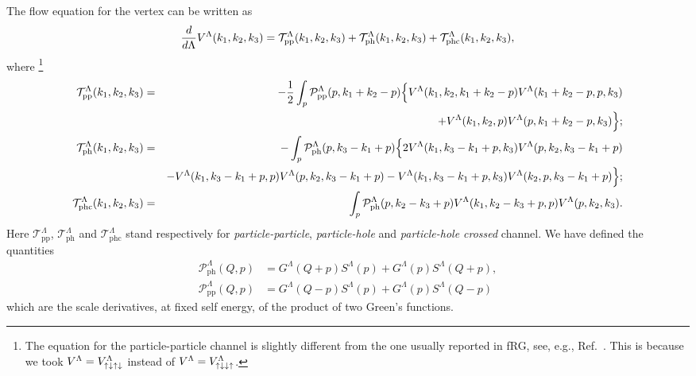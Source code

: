 \begin{widetext} 
The flow equation for the vertex can be written as \cite{Metzner2012, Husemann2009}
\begin{align}
\label{eq:vertflow}
 \frac{d}{d\Lambda}V^\Lambda(k_1,k_2,k_3) = \mathcal{T}^{\Lambda}_{\mathrm{pp} }(k_1,k_2,k_3) +  
  \mathcal{T}^{\Lambda}_{\mathrm{ph} }(k_1,k_2,k_3) + \mathcal{T}^{\Lambda}_{\mathrm{phc} }(k_1,k_2,k_3),
\end{align} 
where \footnote{The equation for the particle-particle channel is slightly different from the one usually reported in fRG, see, e.g., Ref.~. This is because we took $V^{\Lambda}_{\mathrm{} } = V^{\Lambda}_{\mathrm{\uparrow \downarrow \uparrow\downarrow} }$ instead of $V^{\Lambda}_{\mathrm{} } = V^{\Lambda}_{\mathrm{\uparrow\downarrow\downarrow\uparrow} }$.}
\begin{eqnarray}
\label{eq:ppT} 
\mathcal{T}^{\Lambda}_{\mathrm{pp} }(k_1,k_2,k_3) &=&-\frac{1}{2} \int_p \mathcal{P}^{\Lambda}_{\mathrm{\mathrm{pp}} }(p,k_1+k_2-p) \Big\{  V^{\Lambda}_{\mathrm{} }(k_1,k_2,k_1+k_2-p)V^{\Lambda}_{\mathrm{} }(k_1+k_2-p,p,k_3) 
\label{eq:tpp} 
   \\ 
\nonumber
&&+  V^{\Lambda}_{\mathrm{} }(k_1,k_2,p)V^{\Lambda}_{\mathrm{} }(p,k_1+k_2-p,k_3) \Big\} ; \\  
\label{eq:tph} 
\mathcal{T} ^{\Lambda}_{\mathrm{ph} }(k_1,k_2,k_3) & =& -\int_p \mathcal{P}^{\Lambda}_{\mathrm{\mathrm{ph}} }(p,k_3-k_1+p)
\Big\{ 2 V^{\Lambda}_{\mathrm{} }( k_1,k_3-k_1+p,k_3)  V^{\Lambda}_{\mathrm{} }(p,k_2,k_3-k_1+p) \\
\nonumber
&&- V^{\Lambda}_{\mathrm{} }( k_1,k_3-k_1+p,p)  V^{\Lambda}_{\mathrm{} }(p,k_2,k_3-k_1+p) - V^{\Lambda}_{\mathrm{} }( k_1,k_3-k_1+p,k_3)  V^{\Lambda}_{\mathrm{} }(k_2,p,k_3-k_1+p) \Big\}; \\
\label{eq:tphc}
\mathcal{T}^{\Lambda}_{\mathrm{phc} }(k_1,k_2,k_3) & =& \int_p \mathcal{P}^{\Lambda}_{\mathrm{\mathrm{ph}} }(p,k_2-k_3+p) V^{\Lambda}_{\mathrm{} }(k_1,k_2-k_3+p,p)
V^{\Lambda}_{\mathrm{} }(p,k_2,k_3).
\end{eqnarray} 
Here $\mathcal{T}^\Lambda_{\mathrm{pp}}$, $\mathcal{T}^\Lambda_{\mathrm{ph}}$ and $\mathcal{T}^\Lambda_{\mathrm{phc}}$ stand respectively for \textit{particle-particle}, \textit{particle-hole} and \textit{particle-hole crossed} channel.
We have defined the quantities
\begin{align}
 \mathcal{P}_{\mathrm{ph}}^\Lambda(Q,p) &= G^\Lambda(Q+p)S^\Lambda(p) + G^\Lambda(p) S^\Lambda(Q+p), \\ 
 \mathcal{P}_{\mathrm{pp}}^\Lambda(Q,p) &=G^\Lambda(Q-p)S^\Lambda(p) + G^\Lambda(p) S^\Lambda(Q-p) 
\end{align} 
which are the scale derivatives, at fixed self energy, of the product of two Green's functions. %

\end{widetext}

